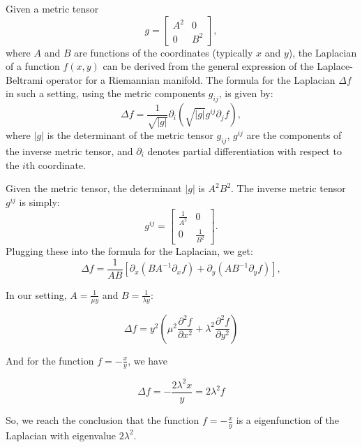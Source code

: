 Given a metric tensor
\[
    g =
    \begin{bmatrix}
        A^2 & 0\\
        0 & B^2
    \end{bmatrix},
\]
where \(A\) and \(B\) are functions of the coordinates (typically \(x\) and \(y\)), the Laplacian of a function \(f(x, y)\) can be derived from the general expression of the Laplace-Beltrami operator for a Riemannian manifold. The formula for the Laplacian \(\Delta f\) in such a setting, using the metric components \(g_{ij}\), is given by:
\[
    \Delta f = \frac{1}{\sqrt{|g|}} \partial_i \left( \sqrt{|g|} g^{ij} \partial_j f \right),
\]
where \(|g|\) is the determinant of the metric tensor \(g_{ij}\), \(g^{ij}\) are the components of the inverse metric tensor, and \(\partial_i\) denotes partial differentiation with respect to the \(i\)th coordinate.

Given the metric tensor, the determinant \(|g|\) is \(A^2B^2\). The inverse metric tensor \(g^{ij}\) is simply:
\[
    g^{ij} =
    \begin{bmatrix}
        \frac{1}{A^2} & 0\\
        0 & \frac{1}{B^2}
    \end{bmatrix}.
\]
Plugging these into the formula for the Laplacian, we get:
\[
    \Delta f = \frac{1}{A B} \left[ \partial_x \left( B A^{-1} \partial_x f \right) + \partial_y \left( A B^{-1} \partial_y f \right) \right],
\]

In our setting, \(A = \frac{1}{\mu y}\) and \(B = \frac{1}{\lambda y}\):

\[
    \Delta f = y^2 \left(\mu^2 \frac{\partial^2 f}{\partial x^2} + \lambda^2 \frac{\partial^2 f}{\partial y^2}\right)
\]

And for the function \(f = - \frac{x}{y}\), we have

\[
    \Delta f = - \frac{2 \lambda^2 x}{y} = 2 \lambda^2 f
\]

So, we reach the conclusion that the function \(f = - \frac{x}{y}\) is a eigenfunction of the Laplacian with eigenvalue \(2 \lambda^2\).